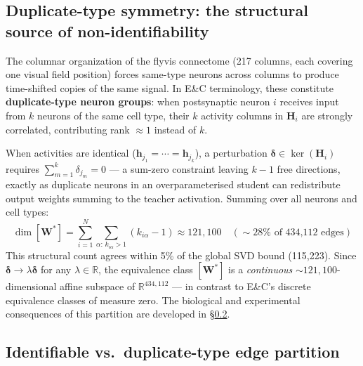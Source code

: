 \documentclass[11pt,a4paper]{article}
\begin{document}
\subsection{Duplicate-type symmetry: the structural source of non-identifiability}
\label{subsec:duplicate}

The columnar organization of the flyvis connectome (217 columns, each covering
one visual field position) forces same-type neurons across columns to produce
time-shifted copies of the same signal. In E\&C terminology, these constitute
\textbf{duplicate-type neuron groups}: when postsynaptic neuron $i$ receives
input from $k$ neurons of the same cell type, their $k$ activity columns in
$\mathbf{H}_i$ are strongly correlated, contributing rank $\approx 1$ instead of
$k$.

When activities are identical ($\mathbf{h}_{j_1} = \cdots = \mathbf{h}_{j_k}$), a
perturbation $\boldsymbol{\delta} \in \ker(\mathbf{H}_i)$ requires
$\sum_{m=1}^{k}\delta_{j_m} = 0$ --- a sum-zero constraint leaving $k-1$ free
directions, exactly as duplicate neurons in an overparameterised student can
redistribute output weights summing to the teacher activation. Summing over all
neurons and cell types:
\begin{equation}
\dim[\mathbf{W}^*] = \sum_{i=1}^{N} \sum_{\alpha:\,k_{i\alpha}>1} (k_{i\alpha}-1)
\approx 121{,}100 \quad (\sim 28\% \text{ of 434,112 edges})
\end{equation}
This structural count agrees within 5\% of the global SVD bound (115,223). Since
$\boldsymbol{\delta} \to \lambda\boldsymbol{\delta}$ for any $\lambda \in \mathbb{R}$,
the equivalence class $[\mathbf{W}^*]$ is a \emph{continuous}
$\sim 121{,}100$-dimensional affine subspace of $\mathbb{R}^{434{,}112}$ ---
in contrast to E\&C's discrete equivalence classes of measure zero.  The
biological and experimental consequences of this partition are developed in
\S\ref{subsec:partition}.

\subsection{Identifiable vs.\ duplicate-type edge partition}
\label{subsec:partition}
\end{document}
